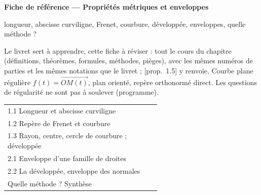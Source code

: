 \documentclass[a4paper,10pt]{article}
\newcommand{\vv}[1]{\overrightarrow{#1}}\newcommand{\ve}[1]{\vec{#1}}
\newcommand{\livre}[1]{{\sffamily\scriptsize\color{Gris}[#1]}}
\begin{document}
\thispagestyle{empty}
\noindent\colorbox{Bleu}{\parbox{\dimexpr\linewidth-2\fboxsep}{\vspace{0.4em}
{\color{white}\sffamily\scriptsize{}}\par\smallskip
{\color{white}\sffamily\bfseries\LARGE Fiche de référence --- Propriétés métriques et enveloppes}\par\smallskip
{\color{white!85!Bleu}\sffamily longueur, abscisse curviligne, Frenet, courbure, développée, enveloppes, quelle méthode ?}\vspace{0.4em}}}

\vspace{0.6em}
{\small Le livret sert à apprendre, cette fiche à réviser : tout le cours du chapitre (définitions, théorèmes, formules, méthodes, pièges), avec les mêmes numéros de parties et les mêmes notations que le livret ; \livre{prop.~1.5} y renvoie. Courbe plane régulière $f(t)=\vv{OM(t)}$, plan orienté, repère orthonormé direct. Les questions de régularité ne sont pas à soulever (programme).}

\vspace{0.4em}
{\small\sffamily\noindent\begin{tabular}{@{}p{0.6\linewidth}@{}}
1.1 Longueur et abscisse curviligne \dotfill\pageref{n11}\\
1.2 Repère de Frenet et courbure \dotfill\pageref{n12}\\
1.3 Rayon, centre, cercle de courbure ; développée \dotfill\pageref{n13}\\
2.1 Enveloppe d'une famille de droites \dotfill\pageref{n21}\\
2.2 La développée, enveloppe des normales \dotfill\pageref{n22}\\
Quelle méthode ? Synthèse \dotfill\pageref{n3}\\
\end{tabular}}
\end{document}
